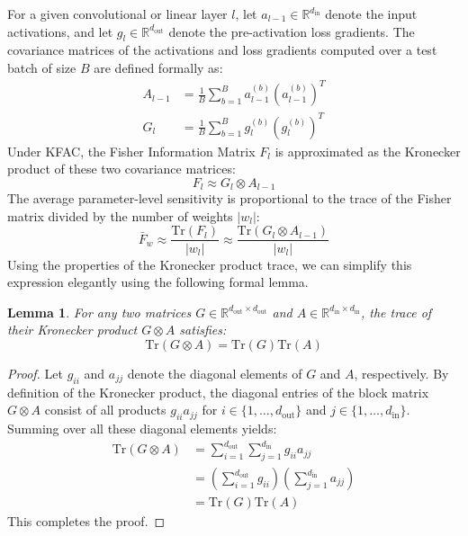 \documentclass{article}
\theoremstyle{plain}
\newtheorem{lemma}[theorem]{Lemma}
\theoremstyle{definition}
\theoremstyle{remark}
\begin{document}
For a given convolutional or linear layer $l$, let $a_{l-1} \in \mathbb{R}^{d_{\text{in}}}$ denote the input activations, and let $g_l \in \mathbb{R}^{d_{\text{out}}}$ denote the pre-activation loss gradients. The covariance matrices of the activations and loss gradients computed over a test batch of size $B$ are defined formally as:
\begin{align}
    A_{l-1} &= \frac{1}{B} \sum_{b=1}^B a_{l-1}^{(b)} (a_{l-1}^{(b)})^T \\
    G_l &= \frac{1}{B} \sum_{b=1}^B g_l^{(b)} (g_l^{(b)})^T
\end{align}
Under KFAC, the Fisher Information Matrix $F_l$ is approximated as the Kronecker product of these two covariance matrices:
\begin{equation}
    F_l \approx G_l \otimes A_{l-1}
\end{equation}
The average parameter-level sensitivity is proportional to the trace of the Fisher matrix divided by the number of weights $|w_l|$:
\begin{equation}
    \bar{F}_w \approx \frac{\text{Tr}(F_l)}{|w_l|} \approx \frac{\text{Tr}(G_l \otimes A_{l-1})}{|w_l|}
\end{equation}
Using the properties of the Kronecker product trace, we can simplify this expression elegantly using the following formal lemma.

\begin{lemma}
For any two matrices $G \in \mathbb{R}^{d_{\text{out}} \times d_{\text{out}}}$ and $A \in \mathbb{R}^{d_{\text{in}} \times d_{\text{in}}}$, the trace of their Kronecker product $G \otimes A$ satisfies:
\begin{equation}
    \text{Tr}(G \otimes A) = \text{Tr}(G)\text{Tr}(A)
\end{equation}
\end{lemma}
\begin{proof}
Let $g_{ii}$ and $a_{jj}$ denote the diagonal elements of $G$ and $A$, respectively. By definition of the Kronecker product, the diagonal entries of the block matrix $G \otimes A$ consist of all products $g_{ii} a_{jj}$ for $i \in \{1, \dots, d_{\text{out}}\}$ and $j \in \{1, \dots, d_{\text{in}}\}$. Summing over all these diagonal elements yields:
\begin{align*}
    \text{Tr}(G \otimes A) &= \sum_{i=1}^{d_{\text{out}}} \sum_{j=1}^{d_{\text{in}}} g_{ii} a_{jj} \\
    &= \left( \sum_{i=1}^{d_{\text{out}}} g_{ii} \right) \left( \sum_{j=1}^{d_{\text{in}}} a_{jj} \right) \\
    &= \text{Tr}(G) \text{Tr}(A)
\end{align*}
This completes the proof.
\end{proof}
\end{document}

